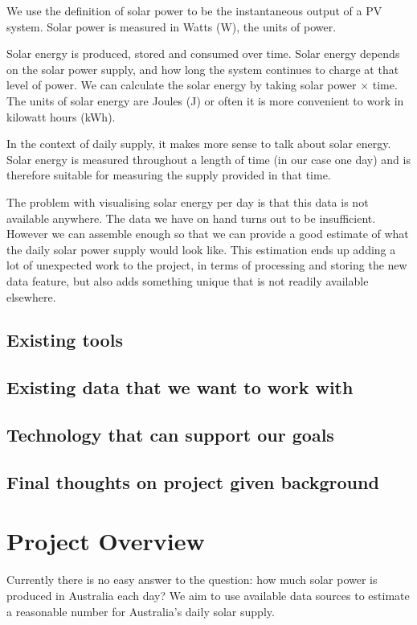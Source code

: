 \documentclass[12pt,a4paper]{report}
\begin{document}
We use the definition of solar power to be the instantaneous output of a PV system. Solar power is measured in Watts (W), the units of power.

Solar energy is produced, stored and consumed over time. Solar energy depends on the solar power supply, and how long the system continues to charge at that level of power. We can calculate the solar energy by taking solar power $\times$ time. The units of solar energy are Joules (J) or often it is more convenient to work in kilowatt hours (kWh).

In the context of daily supply, it makes more sense to talk about solar energy. Solar energy is measured throughout a length of time (in our case one day) and is therefore suitable for measuring the supply provided in that time. 

The problem with visualising solar energy per day is that this data is not available anywhere. The data we have on hand turns out to be insufficient. However we can assemble enough so that we can provide a good estimate of what the daily solar power supply would look like.  This estimation ends up adding a lot of unexpected work to the project, in terms of processing and storing the new data feature, but also adds something unique that is not readily available elsewhere.

\subsection{Existing tools}

\subsection{Existing data that we want to work with}

\subsection{Technology that can support our goals}

\subsection{Final thoughts on project given background}

\section{Project Overview}

Currently there is no easy answer to the question: how much solar power is produced in Australia each day? We aim to use available data sources to estimate a reasonable number for Australia's daily solar supply. 
\end{document}
